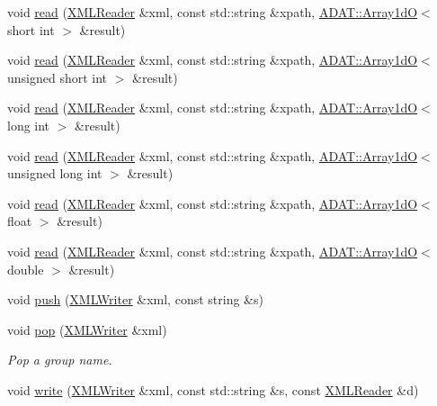 \begin{DoxyCompactItemize}
\item 
void \mbox{\hyperlink{group__io_gaf12f0eb15652e228314c4a67e168688d}{read}} (\mbox{\hyperlink{classADATXML_1_1XMLReader}{X\+M\+L\+Reader}} \&xml, const std\+::string \&xpath, \mbox{\hyperlink{classADAT_1_1Array1dO}{A\+D\+A\+T\+::\+Array1dO}}$<$ short int $>$ \&result)
\item 
void \mbox{\hyperlink{group__io_gafcc468224ec7aadb6f062319ee4a9017}{read}} (\mbox{\hyperlink{classADATXML_1_1XMLReader}{X\+M\+L\+Reader}} \&xml, const std\+::string \&xpath, \mbox{\hyperlink{classADAT_1_1Array1dO}{A\+D\+A\+T\+::\+Array1dO}}$<$ unsigned short int $>$ \&result)
\item 
void \mbox{\hyperlink{group__io_gaf73cf1373de71e822e6e7ddb48581714}{read}} (\mbox{\hyperlink{classADATXML_1_1XMLReader}{X\+M\+L\+Reader}} \&xml, const std\+::string \&xpath, \mbox{\hyperlink{classADAT_1_1Array1dO}{A\+D\+A\+T\+::\+Array1dO}}$<$ long int $>$ \&result)
\item 
void \mbox{\hyperlink{group__io_gabf73a226451fbe3963eed7cf3fbc6849}{read}} (\mbox{\hyperlink{classADATXML_1_1XMLReader}{X\+M\+L\+Reader}} \&xml, const std\+::string \&xpath, \mbox{\hyperlink{classADAT_1_1Array1dO}{A\+D\+A\+T\+::\+Array1dO}}$<$ unsigned long int $>$ \&result)
\item 
void \mbox{\hyperlink{group__io_ga2fb042288bd86fb85377268d95b5e39f}{read}} (\mbox{\hyperlink{classADATXML_1_1XMLReader}{X\+M\+L\+Reader}} \&xml, const std\+::string \&xpath, \mbox{\hyperlink{classADAT_1_1Array1dO}{A\+D\+A\+T\+::\+Array1dO}}$<$ float $>$ \&result)
\item 
void \mbox{\hyperlink{group__io_ga6356b58aa7c58aa4bb8eaed5db9f8f40}{read}} (\mbox{\hyperlink{classADATXML_1_1XMLReader}{X\+M\+L\+Reader}} \&xml, const std\+::string \&xpath, \mbox{\hyperlink{classADAT_1_1Array1dO}{A\+D\+A\+T\+::\+Array1dO}}$<$ double $>$ \&result)
\item 
void \mbox{\hyperlink{namespaceADATXML_a1e8531ea0cb1a302d918f3b427969425}{push}} (\mbox{\hyperlink{classADATXML_1_1XMLWriter}{X\+M\+L\+Writer}} \&xml, const string \&s)
\item 
void \mbox{\hyperlink{group__io_gac235f191b977af85918b9a9d063ba5f4}{pop}} (\mbox{\hyperlink{classADATXML_1_1XMLWriter}{X\+M\+L\+Writer}} \&xml)
\begin{DoxyCompactList}\small\item\em Pop a group name. \end{DoxyCompactList}\item 
void \mbox{\hyperlink{group__io_ga0b5b9fff1a99b7e41bb286c7c153ff78}{write}} (\mbox{\hyperlink{classADATXML_1_1XMLWriter}{X\+M\+L\+Writer}} \&xml, const std\+::string \&s, const \mbox{\hyperlink{classADATXML_1_1XMLReader}{X\+M\+L\+Reader}} \&d)

\end{DoxyCompactItemize}
